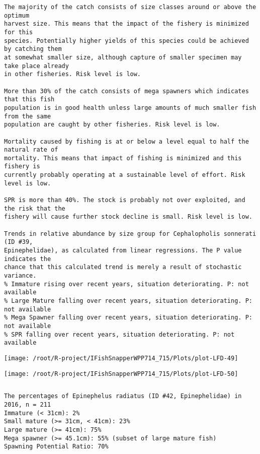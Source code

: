 \documentclass{report}\usepackage[]{graphicx}\usepackage[]{color}
\makeatletter
\def\maxwidth{ %
  \ifdim\Gin@nat@width>\linewidth
    \linewidth
  \else
    \Gin@nat@width
  \fi
}
\newenvironment{kframe}{%
 \def\at@end@of@kframe{}%
 \ifinner\ifhmode%
  \def\at@end@of@kframe{\end{minipage}}%
  \begin{minipage}{\columnwidth}%
 \fi\fi%
 \def\FrameCommand##1{\hskip\@totalleftmargin \hskip-\fboxsep
 \colorbox{shadecolor}{##1}\hskip-\fboxsep
     \hskip-\linewidth \hskip-\@totalleftmargin \hskip\columnwidth}%
 \MakeFramed {\advance\hsize-\width
   \@totalleftmargin\z@ \linewidth\hsize
   \@setminipage}}%
 {\par\unskip\endMakeFramed%
 \at@end@of@kframe}
\newenvironment{knitrout}{}{} %
\makeatother
\begin{document}
\begin{knitrout}
\begin{kframe}
\begin{verbatim}
The majority of the catch consists of size classes around or above the optimum
harvest size. This means that the impact of the fishery is minimized for this
species. Potentially higher yields of this species could be achieved by catching them
at somewhat smaller size, although capture of smaller specimen may take place already
in other fisheries. Risk level is low.

More than 30% of the catch consists of mega spawners which indicates that this fish
population is in good health unless large amounts of much smaller fish from the same
population are caught by other fisheries. Risk level is low.
 
Mortality caused by fishing is at or below a level equal to half the natural rate of
mortality. This means that impact of fishing is minimized and this fishery is
currently probably operating at a sustainable level of effort. Risk level is low.
 
SPR is more than 40%. The stock is probably not over exploited, and the risk that the
fishery will cause further stock decline is small. Risk level is low.
 
Trends in relative abundance by size group for Cephalopholis sonnerati (ID #39,
Epinephelidae), as calculated from linear regressions. The P value indicates the
chance that this calculated trend is merely a result of stochastic variance.
% Immature rising over recent years, situation deteriorating. P: not available
% Large Mature falling over recent years, situation deteriorating. P: not available
% Mega Spawner falling over recent years, situation deteriorating. P: not available
% SPR falling over recent years, situation deteriorating. P: not available
\end{verbatim}
\end{kframe}
\texttt{[image: /root/R-project/IFishSnapperWPP714\_715/Plots/plot-LFD-49]} 

\texttt{[image: /root/R-project/IFishSnapperWPP714\_715/Plots/plot-LFD-50]} 
\begin{kframe}\begin{verbatim}
\end{verbatim}
\end{kframe}
\clearpage
\newpage
\begin{kframe}\begin{verbatim}The percentages of Epinephelus radiatus (ID #42, Epinephelidae) in 2016, n = 211
Immature (< 31cm): 2%
Small mature (>= 31cm, < 41cm): 23%
Large mature (>= 41cm): 75%
Mega spawner (>= 45.1cm): 55% (subset of large mature fish)
Spawning Potential Ratio: 70%
 

\end{verbatim}
\end{kframe}
\end{knitrout}
\end{document}
